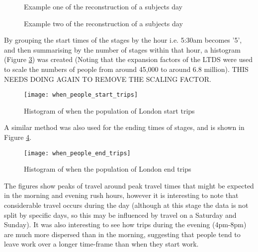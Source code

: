 \begin{landscape}

\begin{figure}[H]
\centering
{}
\caption{Example one of the reconstruction of a subjects day}
\label{fig:routed_results_example}
\end{figure}

\newpage

\begin{figure}[H]
\centering
{}
\caption{Example two of the reconstruction of a subjects day}
\label{fig:routed_results_example2}
\end{figure}

\end{landscape}

By grouping the start times of the stages by the hour i.e. 5:30am becomes '5', and then summarising by the number of stages within that hour, a histogram (Figure \ref{fig:when_people_start_trips}) was created (Noting that the expansion factors of the LTDS were used to scale the numbers of people from around 45,000 to around 6.8 million). THIS NEEDS DOING AGAIN TO REMOVE THE SCALING FACTOR.

\begin{figure}[H]
\centering
\texttt{[image: when\_people\_start\_trips]}
\caption{Histogram of when the population of London start trips}
\label{fig:when_people_start_trips}
\end{figure}

A similar method was also used for the ending times of stages, and is shown in Figure \ref{fig:when_people_end_trips}.

\begin{figure}[H]
\centering
\texttt{[image: when\_people\_end\_trips]}
\caption{Histogram of when the population of London end trips}
\label{fig:when_people_end_trips}
\end{figure}

The figures show peaks of travel around peak travel times that might be expected in the morning and evening rush hours, however it is interesting to note that considerable travel occurs during the day (although at this stage the data is not split by specific days, so this may be influenced by travel on a Saturday and Sunday). It was also interesting to see how trips during the evening (4pm-8pm) are much more dispersed than in the morning, suggesting that people tend to leave work over a longer time-frame than when they start work. 

